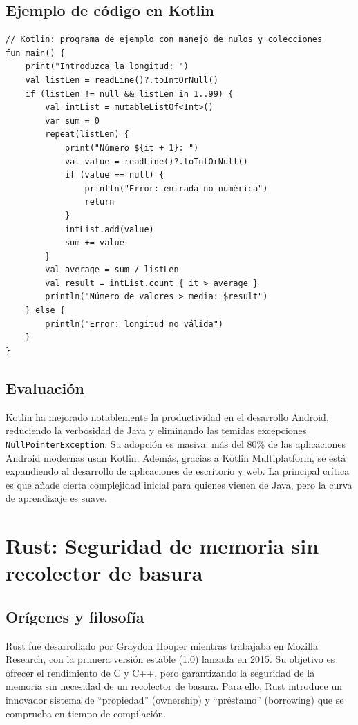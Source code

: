 \subsection{Ejemplo de código en Kotlin}

\begin{verbatim}
// Kotlin: programa de ejemplo con manejo de nulos y colecciones
fun main() {
    print("Introduzca la longitud: ")
    val listLen = readLine()?.toIntOrNull()
    if (listLen != null && listLen in 1..99) {
        val intList = mutableListOf<Int>()
        var sum = 0
        repeat(listLen) {
            print("Número ${it + 1}: ")
            val value = readLine()?.toIntOrNull()
            if (value == null) {
                println("Error: entrada no numérica")
                return
            }
            intList.add(value)
            sum += value
        }
        val average = sum / listLen
        val result = intList.count { it > average }
        println("Número de valores > media: $result")
    } else {
        println("Error: longitud no válida")
    }
}
\end{verbatim}

\subsection{Evaluación}

Kotlin ha mejorado notablemente la productividad en el desarrollo Android, reduciendo la verbosidad de Java y eliminando las temidas excepciones \texttt{NullPointerException}. Su adopción es masiva: más del 80\% de las aplicaciones Android modernas usan Kotlin. Además, gracias a Kotlin Multiplatform, se está expandiendo al desarrollo de aplicaciones de escritorio y web. La principal crítica es que añade cierta complejidad inicial para quienes vienen de Java, pero la curva de aprendizaje es suave.

\section{Rust: Seguridad de memoria sin recolector de basura}

\subsection{Orígenes y filosofía}

Rust fue desarrollado por Graydon Hooper mientras trabajaba en Mozilla Research, con la primera versión estable (1.0) lanzada en 2015. Su objetivo es ofrecer el rendimiento de C y C++, pero garantizando la seguridad de la memoria sin necesidad de un recolector de basura. Para ello, Rust introduce un innovador sistema de ``propiedad'' (ownership) y ``préstamo'' (borrowing) que se comprueba en tiempo de compilación.

